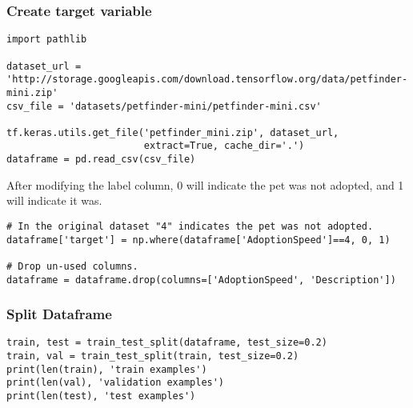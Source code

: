 \begin{frame}[fragile]\frametitle{Create target variable}
\begin{lstlisting}
import pathlib

dataset_url = 'http://storage.googleapis.com/download.tensorflow.org/data/petfinder-mini.zip'
csv_file = 'datasets/petfinder-mini/petfinder-mini.csv'

tf.keras.utils.get_file('petfinder_mini.zip', dataset_url,
                        extract=True, cache_dir='.')
dataframe = pd.read_csv(csv_file) 

\end{lstlisting}

After modifying the label column, 0 will indicate the pet was not adopted, and 1 will indicate it was.

\begin{lstlisting}
# In the original dataset "4" indicates the pet was not adopted.
dataframe['target'] = np.where(dataframe['AdoptionSpeed']==4, 0, 1)

# Drop un-used columns.
dataframe = dataframe.drop(columns=['AdoptionSpeed', 'Description'])
\end{lstlisting}
\end{frame}

\begin{frame}[fragile]\frametitle{Split Dataframe}
\begin{lstlisting}
train, test = train_test_split(dataframe, test_size=0.2)
train, val = train_test_split(train, test_size=0.2)
print(len(train), 'train examples')
print(len(val), 'validation examples')
print(len(test), 'test examples')
\end{lstlisting}

\end{frame}

